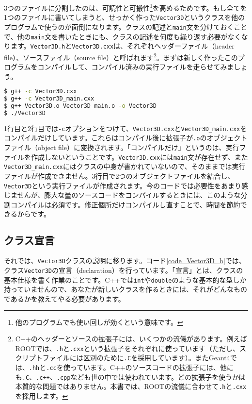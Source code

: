 3つのファイルに分割したのは、可読性と可搬性\footnote{他のプログラムでも使い回しが効くという意味です。}を高めるためです。もし全てを1つのファイルに書いてしまうと、せっかく作った\texttt{Vector3D}というクラスを他のプログラムで使うのが面倒になります。クラスの記述と\texttt{main}文を分けておくことで、他の\texttt{main}文を書いたときにも、クラスの記述を何度も繰り返す必要がなくなります。\texttt{Vector3D.h}と\texttt{Vector3D.cxx}は、それぞれヘッダーファイル（header file）、ソースファイル（source file）と呼ばれます\footnote{C++のヘッダーとソースの拡張子には、いくつかの流儀があります。例えばROOTでは、\texttt{.h}と\texttt{.cxx}という拡張子をそれぞれに使っています（ただし、スクリプトファイルには区別のために\texttt{.C}を採用しています）。またGeant4では、\texttt{.hh}と\texttt{.cc}を使っています。C++のソースコードの拡張子には、他にも\texttt{.C}、\texttt{.c++}、\texttt{.cpp}なども世の中では使われています。どの拡張子を使うかは本質的な問題ではありません。本書では、ROOTの流儀に合わせて\texttt{.h}と\texttt{.cxx}を採用します。}。まずは新しく作ったこのプログラムをコンパイルして、コンパイル済みの実行ファイルを走らせてみましょう。
\begin{lstlisting}[language=bash]
$ g++ -c Vector3D.cxx
$ g++ -c Vector3D_main.cxx
$ g++ Vector3D.o Vector3D_main.o -o Vector3D
$ ./Vector3D
\end{lstlisting}
1行目と2行目では\texttt{-c}オプションをつけて、\texttt{Vector3D.cxx}と\texttt{Vector3D\_main.cxx}をコンパイルだけしています。これらはコンパイル後に拡張子が\texttt{.o}のオブジェクトファイル（object file）に変換されます。「コンパイルだけ」というのは、実行ファイルを作成しないということです。\texttt{Vector3D.cxx}には\texttt{main}文が存在せず、また\texttt{Vector3D\_main.cxx}にはクラスの中身が書かれていないので、そのままでは実行ファイルが作成できません。3行目で2つのオブジェクトファイルを結合し、\texttt{Vector3D}という実行ファイルが作成されます。今のコードでは必要性をあまり感じませんが、膨大な量のソースコードをコンパイルするときには、このような分割コンパイルは必須です。修正個所だけコンパイルし直すことで、時間を節約できるからです。

\subsection{クラス宣言}
それでは、\texttt{Vector3D}クラスの説明に移ります。コード\ref{code_Vector3D_h}では、クラス\texttt{Vector3D}の宣言（declaration）を行っています。「宣言」とは、クラスの基本仕様を書く作業のことです。C++では\texttt{int}や\texttt{double}のような基本的な型しか持っていませんので、あなたが新しいクラスを作るときには、それがどんなものであるかを教えてやる必要があります。

